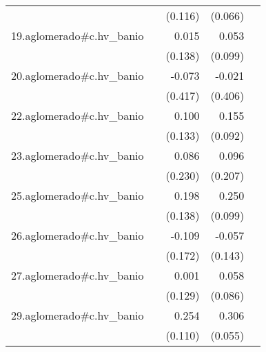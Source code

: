 {\begin{longtable}{l*{4}{D{.}{.}{-1}}}
            &                     &     (0.116)         &     (0.066)         &                     \\
\addlinespace
19.aglomerado#c.hv\_banio&                     &       0.015         &       0.053         &                     \\
            &                     &     (0.138)         &     (0.099)         &                     \\
\addlinespace
20.aglomerado#c.hv\_banio&                     &      -0.073         &      -0.021         &                     \\
            &                     &     (0.417)         &     (0.406)         &                     \\
\addlinespace
22.aglomerado#c.hv\_banio&                     &       0.100         &       0.155         &                     \\
            &                     &     (0.133)         &     (0.092)         &                     \\
\addlinespace
23.aglomerado#c.hv\_banio&                     &       0.086         &       0.096         &                     \\
            &                     &     (0.230)         &     (0.207)         &                     \\
\addlinespace
25.aglomerado#c.hv\_banio&                     &       0.198         &       0.250\sym{*}  &                     \\
            &                     &     (0.138)         &     (0.099)         &                     \\
\addlinespace
26.aglomerado#c.hv\_banio&                     &      -0.109         &      -0.057         &                     \\
            &                     &     (0.172)         &     (0.143)         &                     \\
\addlinespace
27.aglomerado#c.hv\_banio&                     &       0.001         &       0.058         &                     \\
            &                     &     (0.129)         &     (0.086)         &                     \\
\addlinespace
29.aglomerado#c.hv\_banio&                     &       0.254\sym{*}  &       0.306\sym{***}&                     \\
            &                     &     (0.110)         &     (0.055)         &                     \\

\end{longtable}}
